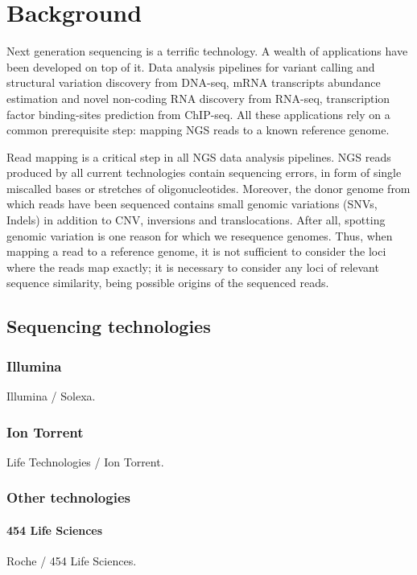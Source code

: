 
\chapter{Background}

Next generation sequencing is a terrific technology.
A wealth of applications have been developed on top of it.
Data analysis pipelines for variant calling and structural variation discovery from DNA-seq, mRNA transcripts abundance estimation and novel non-coding RNA discovery from RNA-seq, transcription factor binding-sites prediction from ChIP-seq.
All these applications rely on a common prerequisite step: mapping NGS reads to a known reference genome.

Read mapping is a critical step in all NGS data analysis pipelines.
NGS reads produced by all current technologies contain sequencing errors, in form of single miscalled bases or stretches of oligonucleotides.
Moreover, the donor genome from which reads have been sequenced contains small genomic variations (SNVs, Indels) in addition to CNV, inversions and translocations.
After all, spotting genomic variation is one reason for which we resequence genomes.
Thus, when mapping a read to a reference genome, it is not sufficient to consider the loci where the reads map exactly; it is necessary to consider any loci of relevant sequence similarity, being possible origins of the sequenced reads.

\section{Sequencing technologies}

\subsection{Illumina}
Illumina / Solexa.

\subsection{Ion Torrent}
Life Technologies / Ion Torrent.

\subsection{Other technologies}

\subsubsection{454 Life Sciences}
Roche / 454 Life Sciences.

